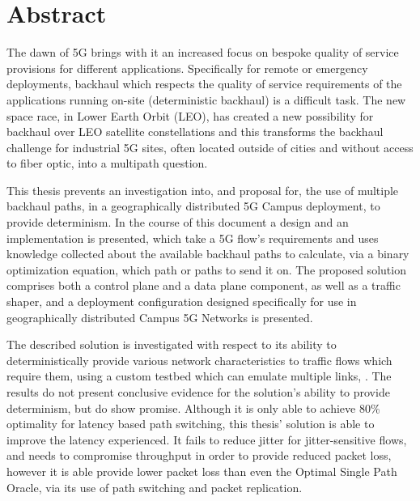 
\cleardoublepage
{}
\section*{Abstract}

The dawn of 5G brings with it an increased focus on bespoke quality of service provisions for different applications. Specifically for remote or emergency deployments, backhaul which respects the quality of service requirements of the applications running on-site (deterministic backhaul) is a difficult task. The new space race, in Lower Earth Orbit (LEO), has created a new possibility for backhaul over LEO satellite constellations and this transforms the backhaul challenge for industrial 5G sites, often located outside of cities and without access to fiber optic, into a multipath question.

This thesis prevents an investigation into, and proposal for, the use of multiple backhaul paths, in a geographically distributed 5G Campus deployment, to provide determinism. In the course of this document a design and an implementation is presented, which take a 5G flow's requirements and uses knowledge collected about the available backhaul paths to calculate, via a binary optimization equation, which path or paths to send it on. The proposed solution comprises both a control plane and a data plane component, as well as a traffic shaper, and a deployment configuration designed specifically for use in geographically distributed Campus 5G Networks is presented.

The described solution is investigated with respect to its ability to deterministically provide various network characteristics to traffic flows which require them, using a custom testbed which can emulate multiple links, . The results do not present conclusive evidence for the solution's ability to provide determinism, but do show promise. Although it is only able to achieve 80\% optimality for latency based path switching, this thesis' solution is able to improve the latency experienced. It fails to reduce jitter for jitter-sensitive flows, and needs to compromise throughput in order to provide reduced packet loss, however it is able provide lower packet loss than even the Optimal Single Path Oracle, via its use of path switching and packet replication.


